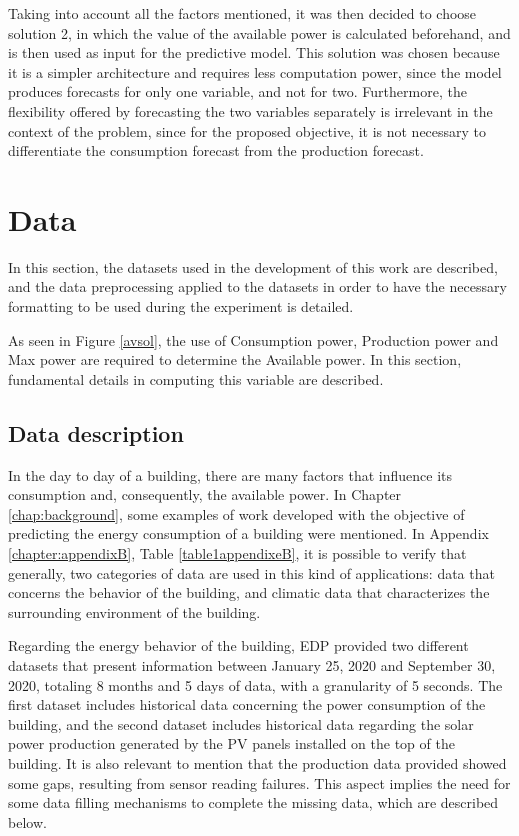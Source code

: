 Taking into account all the factors mentioned, it was then decided to choose solution 2, in which the value of the available power is calculated beforehand, and is then used as input for the predictive model. This solution was chosen because it is a simpler architecture and requires less computation power, since the model produces forecasts for only one variable, and not for two. Furthermore, the flexibility offered by forecasting the two variables separately is irrelevant in the context of the problem, since for the proposed objective, it is not necessary to differentiate the consumption forecast from the production forecast. 

\section{Data}\label{chap3:sec:data}

In this section, the datasets used in the development of this work are described, and the data preprocessing applied to the datasets in order to have the necessary formatting to be used during the experiment is detailed.

As seen in Figure \ref{avsol}, the use of Consumption power, Production power and Max power are required to determine the Available power. In this section, fundamental details in computing this variable are described.

\subsection{Data description}\label{chap3:subsec:data_description}

In the day to day of a building, there are many factors that influence its consumption and, consequently, the available power. In Chapter \ref{chap:background}, some examples of work developed with the objective of predicting the energy consumption of a building were mentioned. In Appendix \ref{chapter:appendixB}, Table \ref{table1appendixeB}, it is possible to verify that generally, two categories of data are used in this kind of applications: data that concerns the behavior of the building, and climatic data that characterizes the surrounding environment of the building.

Regarding the energy behavior of the building, \ac{EDP} provided two different datasets that present information between January 25, 2020 and September 30, 2020, totaling 8 months and 5 days of data, with a granularity of 5 seconds. The first dataset includes historical data concerning the power consumption of the building, and the second dataset includes historical data regarding the solar power production generated by the \ac{PV} panels installed on the top of the building. It is also relevant to mention that the production data provided showed some gaps, resulting from sensor reading failures. This aspect implies the need for some data filling mechanisms to complete the missing data, which are described below.

